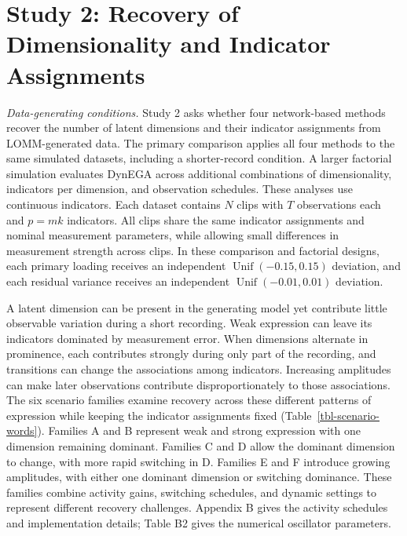 \documentclass[
]{article}
\begin{document}
\section{Study 2: Recovery of Dimensionality and Indicator
Assignments}\label{study-2-recovery-of-dimensionality-and-indicator-assignments}

\emph{Data-generating conditions.} Study 2 asks whether four
network-based methods recover the number of latent dimensions and their
indicator assignments from LOMM-generated data. The primary comparison
applies all four methods to the same simulated datasets, including a
shorter-record condition. A larger factorial simulation evaluates DynEGA
across additional combinations of dimensionality, indicators per
dimension, and observation schedules. These analyses use continuous
indicators. Each dataset contains \(N\) clips with \(T\) observations
each and \(p=mk\) indicators. All clips share the same indicator
assignments and nominal measurement parameters, while allowing small
differences in measurement strength across clips. In these comparison
and factorial designs, each primary loading receives an independent
\(\operatorname{Unif}(-0.15,0.15)\) deviation, and each residual
variance receives an independent \(\operatorname{Unif}(-0.01,0.01)\)
deviation.

A latent dimension can be present in the generating model yet contribute
little observable variation during a short recording. Weak expression
can leave its indicators dominated by measurement error. When dimensions
alternate in prominence, each contributes strongly during only part of
the recording, and transitions can change the associations among
indicators. Increasing amplitudes can make later observations contribute
disproportionately to those associations. The six scenario families
examine recovery across these different patterns of expression while
keeping the indicator assignments fixed
(Table~\ref{tbl-scenario-words}). Families A and B represent weak and
strong expression with one dimension remaining dominant. Families C and
D allow the dominant dimension to change, with more rapid switching in
D. Families E and F introduce growing amplitudes, with either one
dominant dimension or switching dominance. These families combine
activity gains, switching schedules, and dynamic settings to represent
different recovery challenges. Appendix B gives the activity schedules
and implementation details; Table B2 gives the numerical oscillator
parameters.
\end{document}
